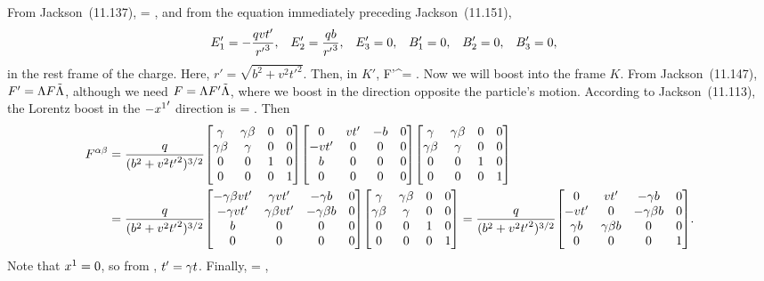 \newcommand{\Fmat}{\mqty[	0 & -\Eq & -\Ew & -\Ee \\
						\Eq & 0 & -\Be & \Bw \\
						\Ew & \Be & 0 & -\Bq \\
						\Ee & -\Bw & \Bq & 0 ]}
\newcommand{\Fpab}{{F'}^{\alp\bet}}
\newcommand{\rp}{{r'}}
\newcommand{\tLam}{\tilde{\Lam}}
\newcommand{\Lammat}{\mqty[\gam & \gam \beta & 0 & 0 \\	
						\gam \beta & \gam & 0 & 0 \\
						0 & 0 & 1 & 0 \\
						0 & 0 & 0 & 1 ]}

\begin{solution}
	From Jackson~(11.137),
	\beqn \label{F}
		\Fab = \Fmat,
	\eeqn
	and from the equation immediately preceding Jackson~(11.151),
	\begin{align*}
		\Eq' &= -\frac{q v t'}{\rp^3}, &
		\Ew' &= \frac{q b}{\rp^3}, &
		\Ee' &= 0, &
		\Bq' &= 0, &
		\Bw' &= 0, &
		\Be' &= 0,
	\end{align*}
	in the rest frame of the charge.  Here, $r' = \sqrt{b^2 + v^2 {t'}^2}$.  Then, in $K'$,
	\beqn \label{thing2.1b}
		\Fpab = 
			\mqty[0 & v t' & -b & 0 \\
				-v t' & 0 & 0 & 0 \\
				b & 0 & 0 & 0 \\
				0 & 0 & 0 & 0 ].
	\eeqn
	Now we will boost into the frame $K$.  From Jackson~(11.147), $F' = \Lam F \tLam$, although we need $F = \Lam F' \tLam$, where we boost in the direction opposite the particle's motion.  According to Jackson~(11.113), the Lorentz boost in the $-{x^1}'$ direction is
	\beqn \label{Lam2}
		\Lam = \Lammat.
	\eeqn
	Then
	\begin{align*}
		\Fab &= \frac{q}{(b^2 + v^2 {t'}^2)^{3/2}} \Lammat
			\mqty[ 0 & v t' & -b & 0 \\
				-v t' & 0 & 0 & 0 \\
				b & 0 & 0 & 0 \\
				0 & 0 & 0 & 0 ]
			\Lammat \\
		&= \frac{q}{(b^2 + v^2 {t'}^2)^{3/2}}
			\mqty[ -\gam \bet v t' & \gam v t' & -\gam b & 0 \\
				-\gam v t' & \gam \bet v t' & -\gam \bet b & 0 \\
				b & 0 & 0 & 0 \\
				0 & 0 & 0 & 0 ]
			\Lammat
		= \frac{q}{(b^2 + v^2 {t'}^2)^{3/2}}
			\mqty[ 0 & v t' & -\gam b & 0 \\
				-v t' & 0 & -\gam \bet b & 0 \\
				\gam b & \gam \bet b & 0 & 0 \\
				0 & 0 & 0 & 1 ].
	\end{align*}
	Note that $x^1 = 0$, so from , $t' = \gamma t$.  Finally,
	\beqn \label{thing2.1}
		\Fab =  
			\mqty[0 & v t & -b & 0 \\
				-v t & 0 & -v b / c & 0 \\
				b & v b / c & 0 & 0 \\
				0 & 0 & 0 & 0 ],
	\eeqn
	

\end{solution}
